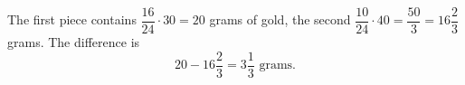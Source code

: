 The first piece contains $\dfrac{16}{24}\cdot30=20$ grams of gold, the second $\dfrac{10}{24}\cdot40=\dfrac{50}{3}=16\dfrac{2}{3}$ grams. The difference is
\[
20-16\dfrac{2}{3}=\boxed{3\dfrac{1}{3}}\text{ grams}.
\]
